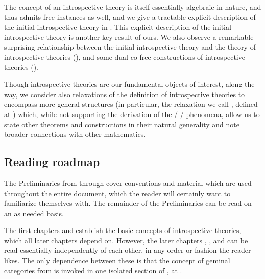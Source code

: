 The concept of an introspective theory is itself essentially algebraic in nature, and thus admits free instances as well, and we give a tractable explicit description of the initial introspective theory in . This explicit description of the initial introspective theory is another key result of ours. We also observe a remarkable surprising relationship between the initial introspective theory and the theory of introspective theories (), and some dual co-free constructions of introspective theories ().

Though introspective theories are our fundamental objects of interest, along the way, we consider also relaxations of the definition of introspective theories to encompass more general structures (in particular, the relaxation we call , defined at ) which, while not supporting the derivation of the \Godel/-\Lob/ phenomena, allow us to state other theorems and constructions in their natural generality and note broader connections with other mathematics.


\subsection{Reading roadmap}
The Preliminaries from  through  cover conventions and material which are used throughout the entire document, which the reader will certainly want to familiarize themselves with. The remainder of the Preliminaries can be read on an as needed basis.

The first chapters  and  establish the basic concepts of introspective theories, which all later chapters depend on. However, the later chapters , , and  can be read essentially independently of each other, in any order or fashion the reader likes. The only dependence between these is that the concept of geminal categories from  is invoked in one isolated section of , at .

\fileend